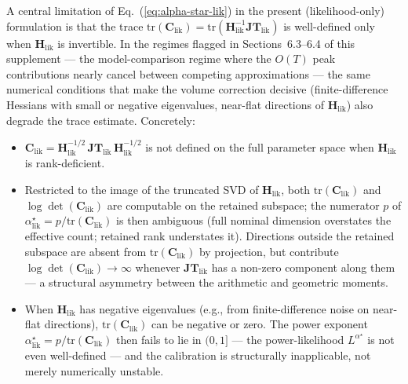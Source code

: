 \documentclass[11pt]{article}
\begin{document}
A central limitation of Eq.~(\ref{eq:alpha-star-lik}) in the present (likelihood-only) formulation is that the trace $\mathrm{tr}(\mathbf C_{\mathrm{lik}}) = \mathrm{tr}(\mathbf H_{\mathrm{lik}}^{-1}\mathbf{JT}_{\mathrm{lik}})$ is well-defined only when $\mathbf H_{\mathrm{lik}}$ is invertible. In the regimes flagged in Sections~6.3--6.4 of this supplement --- the model-comparison regime where the $O(T)$ peak contributions nearly cancel between competing approximations --- the same numerical conditions that make the volume correction decisive (finite-difference Hessians with small or negative eigenvalues, near-flat directions of $\mathbf H_{\mathrm{lik}}$) also degrade the trace estimate. Concretely:
\begin{itemize}
\item $\mathbf C_{\mathrm{lik}} = \mathbf H_{\mathrm{lik}}^{-1/2}\,\mathbf{JT}_{\mathrm{lik}}\,\mathbf H_{\mathrm{lik}}^{-1/2}$ is not defined on the full parameter space when $\mathbf H_{\mathrm{lik}}$ is rank-deficient.
\item Restricted to the image of the truncated SVD of $\mathbf H_{\mathrm{lik}}$, both $\mathrm{tr}(\mathbf C_{\mathrm{lik}})$ and $\log\det(\mathbf C_{\mathrm{lik}})$ are computable on the retained subspace; the numerator $p$ of $\alpha^\star_{\mathrm{lik}} = p/\mathrm{tr}(\mathbf C_{\mathrm{lik}})$ is then ambiguous (full nominal dimension overstates the effective count; retained rank understates it). Directions outside the retained subspace are absent from $\mathrm{tr}(\mathbf C_{\mathrm{lik}})$ by projection, but contribute $\log\det(\mathbf C_{\mathrm{lik}}) \to \infty$ whenever $\mathbf{JT}_{\mathrm{lik}}$ has a non-zero component along them --- a structural asymmetry between the arithmetic and geometric moments.
\item When $\mathbf H_{\mathrm{lik}}$ has negative eigenvalues (e.g., from finite-difference noise on near-flat directions), $\mathrm{tr}(\mathbf C_{\mathrm{lik}})$ can be negative or zero. The power exponent $\alpha^\star_{\mathrm{lik}} = p/\mathrm{tr}(\mathbf C_{\mathrm{lik}})$ then fails to lie in $(0,1]$ --- the power-likelihood $L^{\alpha^\star}$ is not even well-defined --- and the calibration is structurally inapplicable, not merely numerically unstable.
\end{itemize}
\end{document}
